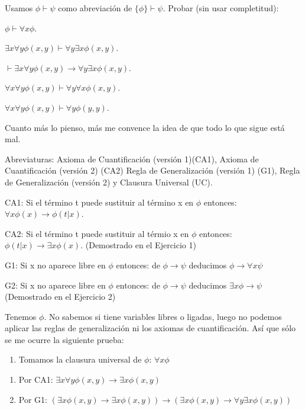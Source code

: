 \begin{problem}  Usamos $\phi \vdash \psi$ como abreviaci\'on de  $\{\phi\} \vdash \psi$.  Probar (sin usar completitud):

\ppart $ \phi  \vdash   \forall x \phi$.

\ppart  $\exists x \forall y \phi (x,y)  \vdash   \forall y \exists x \phi (x,y)$.

\ppart  $ \vdash  \exists x \forall y \phi (x,y)  \to \forall y \exists x \phi (x,y)$.

\ppart   $  \forall x \forall y \phi (x,y) \vdash   \forall y \forall x \phi (x,y)$.

\ppart   $  \forall x \forall y \phi (x,y) \vdash   \forall y \phi (y,y)$.

\solution

{\color{orange} Cuanto más lo pienso, más me convence la idea de que todo lo que sigue está mal.}

Abreviaturas: Axioma de Cuantificación (versión 1)(CA1), Axioma de Cuantificación (versión 2) (CA2) Regla de Generalización (versión 1) (G1), Regla de Generalización (versión 2) y  Clausura Universal (UC).


CA1: Si el término t puede sustituir al término x en $\phi$ entonces: $\forall x \phi(x) \to \phi(t|x)$.

CA2: Si el término t puede sustituir al térmio x en $\phi$ entonces: $\phi(t|x) \to \exists x \phi(x)$. (Demostrado en el Ejercicio 1)

G1: Si x no aparece libre en $\phi$ entonces: de $\phi \to \psi$ deducimos $\phi \to \forall x \psi$

G2: Si x no aparece libre en $\phi$ entonces: de $\phi \to \psi$ deducimos $\exists x \phi \to \psi$ (Demostrado en el Ejercicio 2)


\spart
Tenemos $\phi$. No sabemos si tiene variables libres o ligadas, luego no podemos aplicar las reglas de generalización ni los axiomas de cuantificación. Así que sólo se me ocurre la siguiente prueba:

\begin{enumerate}
	\item Tomamos la clausura universal de $\phi$: $\forall x \phi$
\end{enumerate}

\spart

\begin{enumerate}
\item Por CA1: $\exists x \forall y \phi (x,y) \to \exists x \phi (x,y)$
\item Por G1: $ (\exists x \phi (x,y) \to \exists x \phi (x,y))\to (\exists x \phi (x,y) \to \forall y \exists x \phi (x,y))$


\end{enumerate}
\end{problem}
